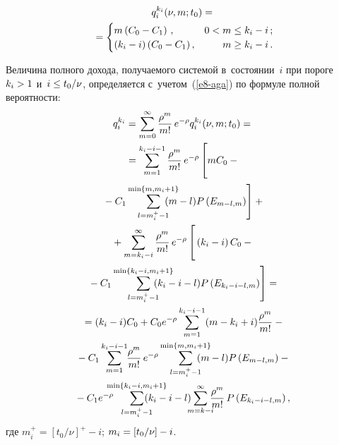 \begin{multicols}{2}
\vspace*{-12pt}

\noindent
 \begin{multline*}
  q_i^{k_i}(\nu,m;t_0) = {}\\
  {}=\begin{cases}
  m\left(C_0-C_1\right)\,, & 0<m\leq k_i-i\,;\\
  (k_i-i)\left(C_0-C_1\right), &\hphantom{0<}{}\; m\geq k_i-i\,.
  \end{cases}
  \end{multline*}

  Величина полного дохода, получаемого системой в~состоянии~$i$ при
пороге $k_i\hm>1$ и~$i\hm\leq t_0/\nu$, определяется с~учетом~(\ref{e8-aga}) по
формуле полной вероятности:
  \begin{multline}
  q_i^{k_i} =\sum\limits_{m=0}^\infty \fr{\rho^m}{m!}\,e^{-\rho} q_i^{k_i}
(\nu,m;t_0)={}\\
  {}=\sum\limits_{m=1}^{k_i-i-1} \fr{\rho^m}{m!}\,e^{-\rho} \left[
  \vphantom{\sum\limits_{l=m_i^+-1}^{\min\{m,m_i+1\}}}
  mC_0 - {}\right.\\
\left.  {}-C_1
\sum\limits_{l=m_i^+-1}^{\min\{m,m_i+1\}} \hspace*{-5mm}(m-l)P\left( E_{m-l,m}\right)
\right]+{}\\
  {}+\sum\limits_{m=k_i-i}^\infty \fr{\rho^m}{m!}\,e^{-\rho} \left[
  \vphantom{\sum\limits_{l=m_i^+-1}^{\min\{m,m_i+1\}}}
  \left(k_i-i\right) C_0-{}\right.\\
\left.  {}-
C_1\sum\limits_{l=m_i^+-1}^{\min\{k_i-i,m_i+1\}} \hspace*{-7mm}(k_i-i-l)P\left( E_{k_i-i-
l,m}\right)\right]={}\\
  {}=(k_i-i)C_0+C_0e^{-\rho} \sum\limits_{m=1}^{k_i-i-1} (m-k_i+i)
\fr{\rho^m}{m!}-{}\\
  {}-C_1\sum\limits_{m=1}^{k_i-i-1} \hspace*{-1mm}\fr{\rho^m}{m!}\,e^{-\rho}
\sum\limits_{l=m_i^+-1}^{\min\{m,m_i+1\}} \hspace*{-5mm}(m-l)P\left( E_{m-l,m}\right)-{}\\
  \hspace*{-3mm}{}-
  C_1e^{-\rho}\hspace*{-3mm}\sum\limits_{l=m_i^+-1}^{\min\{ k_i-i,m_i+1\}}\hspace*{-8mm} (k_i-i-l)\hspace*{-2mm}
\sum\limits_{m=k-i}^\infty \hspace*{-2mm}\fr{\rho^m}{m!}\,P\left( E_{k_i-i-l,m}\right),\!\!\!\!
  \label{e10-aga}
  \end{multline}
где $m_i^+ = [t_0/\nu]^+-i$; $m_i\hm= [t_0/\nu]\hm-i$.


\end{multicols}

